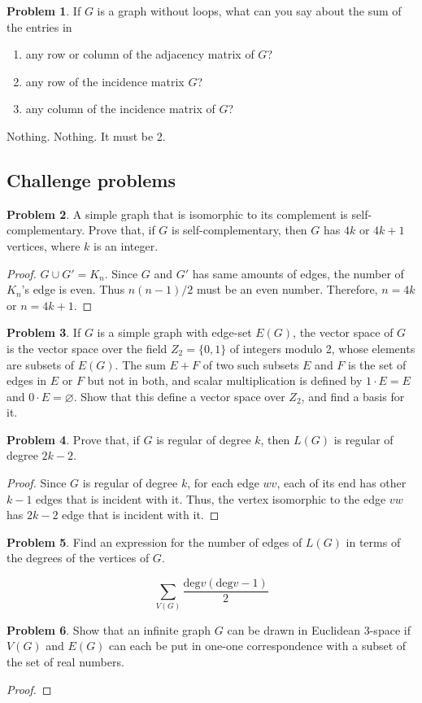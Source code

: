 \documentclass[a4paper,11pt]{article}%
\theoremstyle{remark}
\theoremstyle{definition}
\newtheorem{problem}{Problem}[subsection]
\begin{document}
\begin{problem}
    If $G$ is a graph without loops, what can you say about the sum of the 
    entries in 
    \begin{enumerate}
        \item any row or column of the adjacency matrix of $G$?
        \item any row of the incidence matrix $G$?
        \item any column of the incidence matrix of $G$?
    \end{enumerate}

        Nothing.
        Nothing.
        It must be 2.
\end{problem}
\subsection{Challenge problems}
\begin{problem}
A simple graph that is isomorphic to its complement is self-complementary.
Prove that, if $G$ is self-complementary, then $G$ has $4k$ or $4k+1$ 
vertices, where $k$ is an integer.
\begin{proof}
    $G\cup G'=K_n$. Since $G$ and $G'$ has same amounts of edges, the 
    number of $K_n$'s edge is even. Thus $n(n-1)/2$ must be an even number.
    Therefore, $n=4k$ or $n=4k+1$.
\end{proof}
\end{problem}
\begin{problem}
    If $G$ is a simple graph with edge-set $E(G)$, the vector space of $G$
    is the vector space over the field $Z_2=\{0,1\}$ of integers modulo 2,
    whose elements are subsets of $E(G)$. The sum $E+F$ of two such subsets 
    $E$ and $F$ is the set of edges in $E$ or $F$ but not in both, and 
    scalar multiplication is defined by $1\cdot E=E$ and $0\cdot E=\varnothing$.
    Show that this define a vector space over $Z_2$, and find a basis for it.
\end{problem}
\begin{problem}
    Prove that, if $G$ is regular of degree $k$, then $L(G)$ is regular of degree $2k-2$.
    \begin{proof}
        Since $G$ is regular of degree $k$, for each edge $wv$, each of its end 
        has other $k-1$ edges that is incident with it. Thus, the vertex isomorphic to
        the edge $vw$ has $2k-2$ edge that is incident with it.
    \end{proof}
\end{problem}
\begin{problem}
    Find an expression for the number of edges of $L(G)$ in terms of the degrees of 
    the vertices of $G$.

    \[\sum_{V(G)}\frac{\text{deg}v(\text{deg}v-1)}{2}\]
\end{problem}
\begin{problem}
    Show that an infinite graph $G$ can be drawn in Euclidean 3-space if $V(G)$
    and $E(G)$ can each be put in one-one correspondence with a subset of the 
    set of real numbers.
    \begin{proof}
    \end{proof}
\end{problem}
\end{document}

